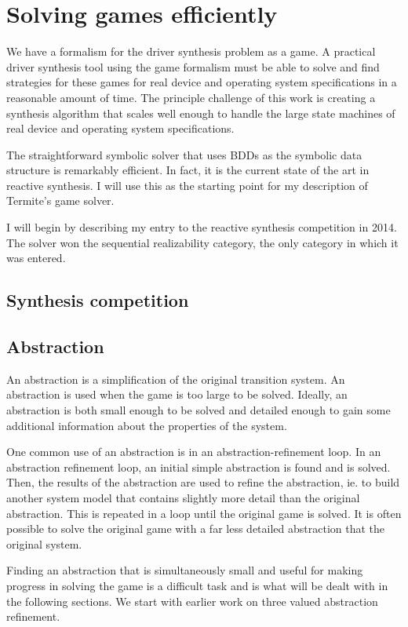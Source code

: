 \documentclass[a4paper,twoside,openright,11pt]{book}
\theoremstyle{definition}
\begin{document}
\chapter{Solving games efficiently}

We have a formalism for the driver synthesis problem as a game. A practical driver synthesis tool using the game formalism must be able to solve and find strategies for these games for real device and operating system specifications in a reasonable amount of time. The principle challenge of this work is creating a synthesis algorithm that scales well enough to handle the large state machines of real device and operating system specifications. 

The straightforward symbolic solver that uses BDDs as the symbolic data structure is remarkably efficient. In fact, it is the current state of the art in reactive synthesis. I will use this as the starting point for my description of Termite's game solver.

I will begin by describing my entry to the reactive synthesis competition in 2014. The solver won the sequential realizability category, the only category in which it was entered.  

\section{Synthesis competition}



\section{Abstraction}
An abstraction is a simplification of the original transition system. An abstraction is used when the game is too large to be solved. Ideally, an abstraction is both small enough to be solved and detailed enough to gain some additional information about the properties of the system. 

One common use of an abstraction is in an abstraction-refinement loop. In an abstraction refinement loop, an initial simple abstraction is found and is solved. Then, the results of the abstraction are used to refine the abstraction, ie. to build another system model that contains slightly more detail than the original abstraction. This is repeated in a loop until the original game is solved. It is often possible to solve the original game with a far less detailed abstraction that the original system. 

Finding an abstraction that is simultaneously small and useful for making progress in solving the game is a difficult task and is what will be dealt with in the following sections. We start with earlier work on three valued abstraction refinement. 
\end{document}
